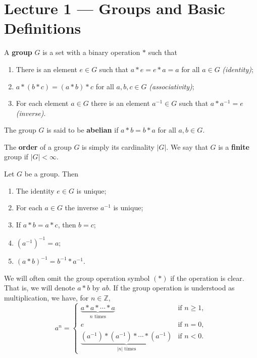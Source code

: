 \section{Lecture 1 — Groups and Basic Definitions}

\begin{definition}[group]
	A \textbf{group} $G$ is a set with a binary operation $*$ such that
	\begin{enumerate}
		\item There is an element $e\in G$ such that $a*e=e*a=a$ for all $a\in G$ \textit{(identity)};
		\item $a*(b*c)=(a*b)*c$ for all $a,b,c\in G$ \textit{(associativity)};
		\item For each element $a\in G$ there is an element $a^{-1}\in G$ such that $a*a^{-1}=e$ \textit{(inverse)}.
	\end{enumerate}
	The group $G$ is said to be \textbf{abelian} if $a*b=b*a$ for all $a,b\in G$.
\end{definition}

\begin{definition}
	The \textbf{order} of a group $G$ is simply its cardinality $|G|$. We say that $G$ is a \textbf{finite} group if $|G|<\infty$.
\end{definition}

\begin{proposition}
	Let $G$ be a group. Then
	\begin{enumerate}
		\item The identity $e\in G$ is unique;
		\item For each $a\in G$ the inverse $a^{-1}$ is unique;
		\item If $a*b=a*c$, then $b=c$;
		\item $(a^{-1})^{-1}=a$;
		\item $(a*b)^{-1}=b^{-1}*a^{-1}$.
	\end{enumerate}
\end{proposition}

We will often omit the group operation symbol $(*)$ if the operation is clear. That is, we will denote $a*b$ by $ab$. If the group operation is understood as multiplication, we have, for $n\in\mathbb Z$,
$$a^n=\begin{cases}
	\underbrace{a*a*\cdots*a}_{n\text{ times}} & \text{if $n\geq 1$},\\
	e & \text{if $n=0$},\\
	\underbrace{(a^{-1})*(a^{-1})*\cdots*(a^{-1})}_{|n|\text{ times}} & \text{if $n<0$}.
\end{cases}$$

